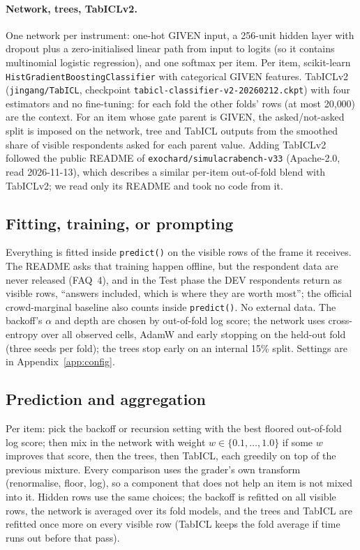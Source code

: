 \documentclass{article}
\begin{document}
\paragraph{Network, trees, TabICLv2.} One network per instrument: one-hot GIVEN
input, a 256-unit hidden layer with dropout plus a zero-initialised linear path
from input to logits (so it contains multinomial logistic regression), and one
softmax per item. Per item, scikit-learn~\citep{pedregosa2011sklearn}
\texttt{HistGradientBoostingClassifier} with categorical GIVEN features.
TabICLv2 (\texttt{jingang/TabICL}, checkpoint
\texttt{tabicl-classifier-v2-20260212.ckpt}) with four estimators and no
fine-tuning: for each fold the other folds' rows (at most 20{,}000) are the
context. For an item whose gate parent is GIVEN, the asked/not-asked split is
imposed on the network, tree and TabICL outputs from the smoothed share of
visible respondents asked for each parent value. Adding TabICLv2 followed the
public README of \texttt{exochard/simulacrabench-v33} (Apache-2.0, read
2026-11-13), which describes a similar per-item out-of-fold blend with
TabICLv2; we read only its README and took no code from it.

\subsection{Fitting, training, or prompting}
Everything is fitted inside \texttt{predict()} on the visible rows of the frame
it receives. The README asks that training happen offline, but the respondent
data are never released (FAQ~4), and in the Test phase the DEV respondents
return as visible rows, ``answers included, which is where they are worth
most''; the official crowd-marginal baseline also counts inside
\texttt{predict()}. No external data. The backoff's $\alpha$ and depth are
chosen by out-of-fold log score; the network uses cross-entropy over all
observed cells, AdamW and early stopping on the held-out fold (three seeds per
fold); the trees stop early on an internal 15\% split. Settings are in
Appendix~\ref{app:config}.

\subsection{Prediction and aggregation}
Per item: pick the backoff or recursion setting with the best floored
out-of-fold log score; then mix in the network with weight $w\in\{0.1,\dots,1.0\}$
if some $w$ improves that score, then the trees, then TabICL, each greedily on
top of the previous mixture. Every comparison uses the grader's own transform
(renormalise, floor, log), so a component that does not help an item is not
mixed into it. Hidden rows use the same choices; the backoff is refitted on all
visible rows, the network is averaged over its fold models, and the trees and
TabICL are refitted once more on every visible row (TabICL keeps the fold
average if time runs out before that pass).
\end{document}
